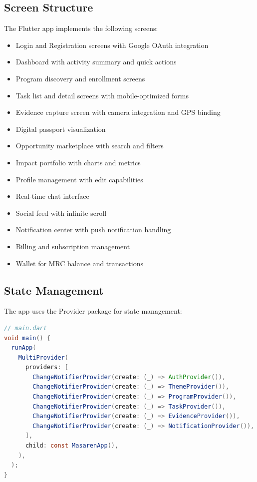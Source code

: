 \documentclass[11pt,a4paper]{article}
\begin{document}
\subsection{Screen Structure}

The Flutter app implements the following screens:
\begin{itemize}
  \item Login and Registration screens with Google OAuth integration
  \item Dashboard with activity summary and quick actions
  \item Program discovery and enrollment screens
  \item Task list and detail screens with mobile-optimized forms
  \item Evidence capture screen with camera integration and GPS binding
  \item Digital passport visualization
  \item Opportunity marketplace with search and filters
  \item Impact portfolio with charts and metrics
  \item Profile management with edit capabilities
  \item Real-time chat interface
  \item Social feed with infinite scroll
  \item Notification center with push notification handling
  \item Billing and subscription management
  \item Wallet for MRC balance and transactions
\end{itemize}

\subsection{State Management}

The app uses the Provider package for state management:

\begin{lstlisting}[language=Java, caption=Provider Setup]
// main.dart
void main() {
  runApp(
    MultiProvider(
      providers: [
        ChangeNotifierProvider(create: (_) => AuthProvider()),
        ChangeNotifierProvider(create: (_) => ThemeProvider()),
        ChangeNotifierProvider(create: (_) => ProgramProvider()),
        ChangeNotifierProvider(create: (_) => TaskProvider()),
        ChangeNotifierProvider(create: (_) => EvidenceProvider()),
        ChangeNotifierProvider(create: (_) => NotificationProvider()),
      ],
      child: const MasarenApp(),
    ),
  );
}
\end{lstlisting}
\end{document}
